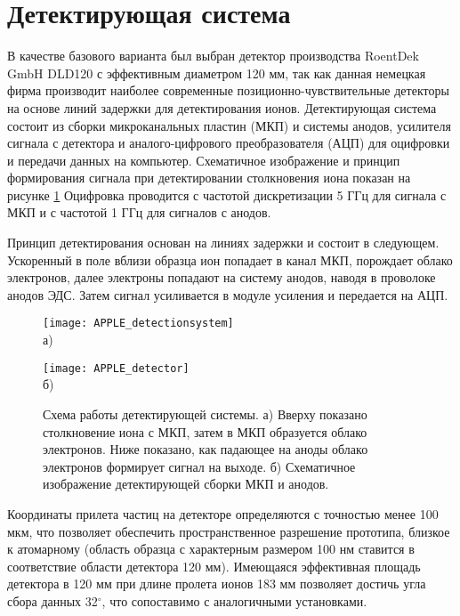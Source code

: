 \FloatBarrier

\section{Детектирующая система}\label{sec:ch2/sec4}

В качестве базового варианта был выбран детектор производства RoentDek GmbH DLD120 с эффективным диаметром 120 мм, так как данная немецкая фирма производит наиболее современные позиционно-чувствительные детекторы на основе линий задержки для детектирования ионов. Детектирующая система состоит из сборки микроканальных пластин (МКП) и системы анодов, усилителя сигнала с детектора и аналого-цифрового преобразователя (АЦП) для оцифровки и передачи данных на компьютер. Схематичное изображение и принцип формирования сигнала при детектировании столкновения иона показан на рисунке \cref{fig:APPLE_detectionsystem} Оцифровка проводится с частотой дискретизации 5 ГГц для сигнала с МКП и с частотой 1 ГГц для сигналов с анодов. 

Принцип детектирования \cite{Spillman00} основан на линиях задержки и состоит в следующем. Ускоренный в поле вблизи образца ион попадает в канал МКП, порождает облако электронов, далее электроны попадают на систему анодов, наводя в проволоке анодов ЭДС. Затем сигнал усиливается в модуле усиления и передается на АЦП.

\begin{figure}[ht]
	\begin{minipage}[b]{0.49\textwidth}\centering
		\texttt{[image: APPLE\_detectionsystem]} \\ а)
	\end{minipage}
	\begin{minipage}[b]{0.49\textwidth}\centering
		\texttt{[image: APPLE\_detector]} \\ б)
	\end{minipage}
	\caption{Схема работы детектирующей системы. а) Вверху показано столкновение иона с МКП, затем в МКП образуется облако электронов. Ниже показано, как падающее на аноды облако электронов формирует сигнал на выходе. б) Схематичное изображение детектирующей сборки МКП и анодов.}
	\label{fig:APPLE_detectionsystem}
\end{figure}


Координаты прилета частиц на детекторе определяются с точностью менее 100 мкм, что позволяет обеспечить пространственное разрешение прототипа, близкое к атомарному (область образца с характерным размером 100 нм ставится в соответствие области детектора 120 мм). Имеющаяся эффективная площадь детектора в 120 мм при длине пролета ионов 183 мм позволяет достичь угла сбора данных 32$^{\circ}$, что сопоставимо с аналогичными установками.

